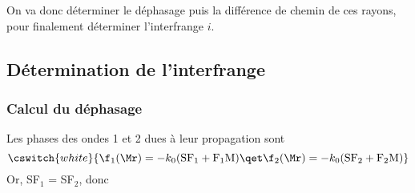 \documentclass[../main/main.tex]{subfiles}
\begin{document}
On va donc déterminer le déphasage puis la différence de chemin de ces rayons,
pour finalement déterminer l'interfrange $i$.

\subsection{Détermination de l'interfrange}
\subsubsection{Calcul du déphasage}

Les phases des ondes 1 et 2 dues à leur propagation sont
\[\cswitch{white}{
    \f_1({\Mr}) = -k_0({\rm SF_1 + F_1M})
    \qet
    \f_2({\Mr}) = -k_0({\rm SF_2 + F_2M})
}\]
Or, SF$_1$ = SF$_2$, donc
\vspace{-20pt}
\end{document}
